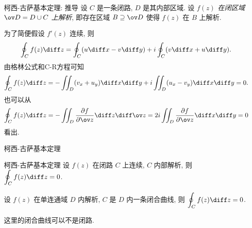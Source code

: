 \begin{frame}{柯西-古萨基本定理: 推导}
	\onslide<+->
	设 $C$ 是一条闭路, $D$ 是其内部区域.
	\onslide<+->
	设 \emph{$f(z)$ 在闭区域 $\ov D=D\cup C$ 上解析},
	\onslide<+->
	即存在区域 $B\supseteq\ov D$ 使得 $f(z)$ 在 $B$ 上解析.

	\onslide<+->
	为了简便假设 $f'(z)$ 连续,
	\onslide<+->
	则
	\[\oint_Cf(z)\diff z=\oint_C(u\diff x-v\diff y)
	+i\oint_C(v\diff x+u\diff y).\]
	\onslide<+->
	由格林公式和C-R方程可知
	\[\oint_Cf(z)\diff z=-\iint_D(v_x+u_y)\diff x\diff y
	+i\iint_D(u_x-v_y)\diff x\diff y=0.\]
	\onslide<+->
	也可以从
	\[\oint_Cf(z)\diff z=-\iint_D\frac{\partial f}{\partial \ov z}\diff z\diff \ov z=2i\iint_D\frac{\partial f}{\partial \ov z}\diff x\diff y=0\]
	看出.
\end{frame}


\begin{frame}{柯西-古萨基本定理}
	\onslide<+->
	\begin{algorithm}{柯西-古萨基本定理}
	设 $f(z)$ 在闭路 $C$ 上连续, $C$ 内部解析, 则 $\displaystyle\oint_Cf(z)\diff z=0$.
	\end{algorithm}

	\onslide<+->
	\begin{corollary}
	设 $f(z)$ 在\alert{单连通域} $D$ 内解析, $C$ 是 $D$ 内一条闭合曲线, 则 $\displaystyle\oint_Cf(z)\diff z=0$.
	\end{corollary}
	\onslide<+->
	这里的闭合曲线可以不是闭路.

\end{frame}


